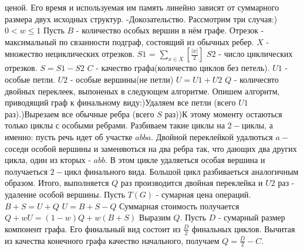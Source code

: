 \documentclass[a4paper,12pt]{article}
\begin{document}
ценой. Его время и используемая им память линейно зависят от суммарного размера двух исходных структур.\newline
-Докозательство. Рассмотрим три случая:) $0<w\le1$\newline
Пусть $B$ - количество особых вершин в нём графе.\newline
Отрезок - максимальный по свзанности подграф, состоящий из обычных ребер.\newline
$X$ - множество нециклических отрезков.\newline
$S1$ = $\sum_{x\in X}{[\frac{|x|}{2}]}$\newline
$S2$ - число циклических отрезков.\newline
$S = S1 - S2$\newline
$C$ - качество графа(количество циклов без петель).\newline
$U1$ - особые петли.\newline
$U2$ - особые вершины(не петли)\newline
$U = U1 + U2$\newline
$Q$ - количесвто двойных переклеек, выпоненых в следующем алгоритме.\newline
Опишем алгоритм, приводящий граф к финальному виду:)Удаляем все петли (всего $U1$ раз).)Вырезаем все обычные ребра (всего $S$ раз))К этому моменту остаються только циклы с особыми ребрами. Разбиваем такие циклы на $2-$циклы, а именно: пусть
речь идет об участке $abba$. Двойной переклейкой удалються $a-$ соседи особой вершины и заменяються на два
ребра так, что дающих два других цикла, один из кторых - $abb$. В этом цикле
удаляеться особая вершина и получаеться $2-$цикл финального вида. Большой цикл разбиваеться аналогичным
образом. Итого, выполняется $Q$ раз производится двойная переклейка и $U2$ раз - удаление особой
вершины.\newline
Пусть $T(G)$ - сумарная цена операций.\newline
$B + S = U + Q$\newline
$U = B + S - Q$\newline
Суммарная стоимость получается $Q + wU = (1 - w)Q + w(B + S)$\newline
Выразим $Q$. Пусть $D$ - сумарный размер компонент графа. Его финальный вид состоит из $\frac{D}{2}$ финальных
циклов. Вычитая из качества конечного графа качество начального, получаем $Q = \frac{D}{2} - C$.\newline
\end{document}

